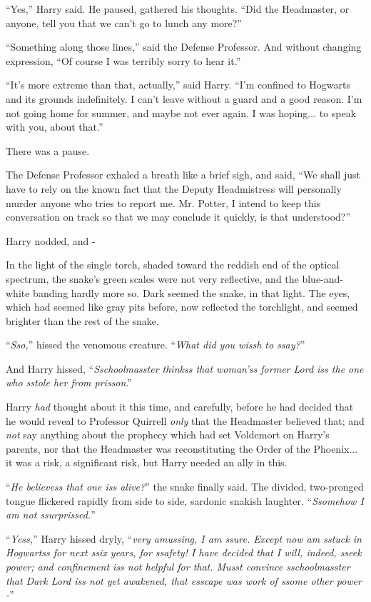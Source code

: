 ``Yes,'' Harry said. He paused, gathered his thoughts. ``Did the Headmaster, or anyone, tell you that we can't go to lunch any more?''

``Something along those lines,'' said the Defense Professor. And without changing expression, ``Of course I was terribly sorry to hear it.''

``It's more extreme than that, actually,'' said Harry. ``I'm confined to Hogwarts and its grounds indefinitely. I can't leave without a guard and a good reason. I'm not going home for summer, and maybe not ever again. I was hoping... to speak with you, about that.''

There was a pause.

The Defense Professor exhaled a breath like a brief sigh, and said, ``We shall just have to rely on the known fact that the Deputy Headmistress will personally murder anyone who tries to report me. Mr. Potter, I intend to keep this conversation on track so that we may conclude it quickly, is that understood?''

Harry nodded, and -

In the light of the single torch, shaded toward the reddish end of the optical spectrum, the snake's green scales were not very reflective, and the blue-and-white banding hardly more so. Dark seemed the snake, in that light. The eyes, which had seemed like gray pits before, now reflected the torchlight, and seemed brighter than the rest of the snake.

``\emph{Sso,}'' hissed the venomous creature. ``\emph{What did you wissh to ssay?}''

And Harry hissed, ``\emph{Sschoolmasster thinkss that woman'ss former Lord iss the one who sstole her from prisson}.''

Harry \emph{had} thought about it this time, and carefully, before he had decided that he would reveal to Professor Quirrell \emph{only} that the Headmaster believed that; and \emph{not} say anything about the prophecy which had set Voldemort on Harry's parents, nor that the Headmaster was reconstituting the Order of the Phoenix... it was a risk, a significant risk, but Harry needed an ally in this.

``\emph{He believess that one iss alive?}'' the snake finally said. The divided, two-pronged tongue flickered rapidly from side to side, sardonic snakish laughter. ``\emph{Ssomehow I am not ssurprissed.}''

``\emph{Yess,}'' Harry hissed dryly, ``\emph{very amussing, I am ssure. Except now am sstuck in Hogwartss for next ssix years, for ssafety! I have decided that I will, indeed, sseek power; and confinement iss not helpful for that. Musst convince sschoolmasster that Dark Lord iss not yet awakened, that esscape was work of ssome other power -}''

